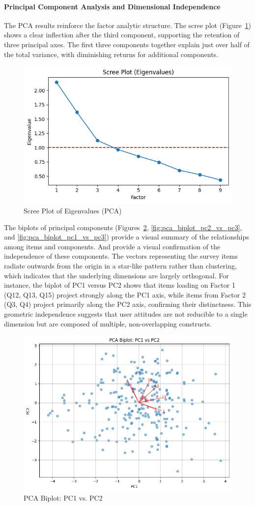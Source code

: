 	\paragraph{Principal Component Analysis and Dimensional Independence}
	The PCA results reinforce the factor analytic structure. The scree plot (Figure~\ref{fig:scree_plot}) shows a clear inflection after the third component, supporting the retention of three principal axes. The first three components together explain just over half of the total variance, with diminishing returns for additional components.
	\begin{figure}[ht]\centering
		\includegraphics[width=0.7\linewidth]{figures/img/factor_analysis/scree_plot.png}
		\caption{Scree Plot of Eigenvalues (PCA)}
		\label{fig:scree_plot}
	\end{figure}
	The biplots of principal components (Figures~\ref{fig:pca_biplot_pc1_vs_pc2}, \ref{fig:pca_biplot_pc2_vs_pc3}, and \ref{fig:pca_biplot_pc1_vs_pc3}) provide a visual summary of the relationships among items and components. And provide a visual confirmation of the independence of these components. The vectors representing the survey items radiate outwards from the origin in a star-like pattern rather than clustering, which indicates that the underlying dimensions are largely orthogonal. For instance, the biplot of PC1 versus PC2 shows that items loading on Factor 1 (Q12, Q13, Q15) project strongly along the PC1 axis, while items from Factor 2 (Q3, Q4) project primarily along the PC2 axis, confirming their distinctness. This geometric independence suggests that user attitudes are not reducible to a single dimension but are composed of multiple, non-overlapping constructs.
	\begin{figure}[ht]\centering
		\includegraphics[width=0.7\linewidth]{figures/img/factor_analysis/pca_biplot_pc1_vs_pc2.png}
		\caption{PCA Biplot: PC1 vs. PC2}
		\label{fig:pca_biplot_pc1_vs_pc2}
	\end{figure}
